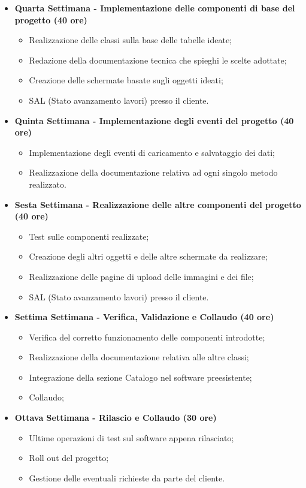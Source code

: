 \begin{itemize}
	\item \textbf{Quarta Settimana - Implementazione delle componenti di base del progetto  (40 ore)} 
	\begin{itemize}
		\item Realizzazione delle classi sulla base delle tabelle ideate;
		\item Redazione della documentazione tecnica che spieghi le scelte adottate;
		\item Creazione delle schermate basate sugli oggetti ideati;
		\item SAL (Stato avanzamento lavori) presso il cliente.
	\end{itemize}
	
	
	\item \textbf{Quinta Settimana - Implementazione degli eventi del progetto (40 ore)} 
	\begin{itemize}
		\item Implementazione degli eventi di caricamento e salvataggio dei dati;
		\item Realizzazione della documentazione relativa ad ogni singolo metodo realizzato.
	\end{itemize}
	
	
	\item \textbf{Sesta Settimana - Realizzazione delle altre componenti del progetto (40 ore)} 
	\begin{itemize}
		\item Test sulle componenti realizzate;
		\item Creazione degli altri oggetti e delle altre schermate da realizzare;
		\item Realizzazione delle pagine di upload delle immagini e dei file;
		\item SAL (Stato avanzamento lavori) presso il cliente.
	\end{itemize}
	
	
	\item \textbf{Settima Settimana - Verifica, Validazione e Collaudo (40 ore)} 
	\begin{itemize}
		\item Verifica del corretto funzionamento delle componenti introdotte;
		\item Realizzazione della documentazione relativa alle altre classi;
		\item Integrazione della sezione Catalogo nel software preesistente;
		\item Collaudo;
	\end{itemize}
	
	
	
	\item \textbf{Ottava Settimana - Rilascio e Collaudo (30 ore)} 
	\begin{itemize}
		\item Ultime operazioni di test sul software appena rilasciato;
		\item Roll out del progetto;
		\item Gestione delle eventuali richieste da parte del cliente.
	\end{itemize}
\end{itemize}



